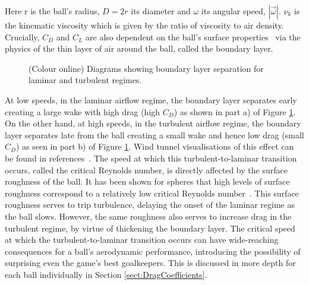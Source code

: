 \documentclass[a4paper]{article}
\begin{document}
Here r is the ball's radius, $D = 2r$ its diameter and $\omega$ its angular speed, $|\vec{\omega}|$.  $\nu_{k}$ is the kinematic viscosity which is given by the ratio of viscosity to air density.  Crucially, $C_D$ and $C_L$ are also dependent on the ball's surface properties~\cite{MehtaRD, AchenbachEhighRe,AchenbachEroughsurf, MehtaRDandPallisJM} via the physics of the thin layer of air around the ball, called the boundary layer.  
%
%
\begin{figure}[t!!] 
  \begin{center} 
  \captionsetup[subfigure]{width=0.42\textwidth}
 \end{center}
\vspace{-0.5cm}
 \caption{(Colour online) Diagrams showing boundary layer separation for laminar and turbulent regimes. }
 \label{fig:BoundaryLayerComparison}
\end{figure}
%
%
At low speeds, in the laminar airflow regime, the boundary layer separates early creating a large wake with high drag (high $C_D$) as shown in part a) of Figure \ref{fig:BoundaryLayerComparison}.  On the other hand, at high speeds, in the turbulent airflow regime, the boundary layer separates late from the ball creating a small wake and hence low drag (small $C_D$) as seen in part b) of Figure \ref{fig:BoundaryLayerComparison}. 
Wind tunnel visualisations of this effect can be found in references~\cite{AsaiTSeoKKobayashiOandSakashitaR, ThorstenKetal}.  The speed at which this turbulent-to-laminar transition occurs, called the critical Reynolds number, is directly affected by the surface roughness of the ball.  It has been shown for spheres that high levels of surface roughness correspond to a relatively low critical Reynolds number~\cite{AchenbachEroughsurf}.  This surface roughness serves to trip turbulence, delaying the onset of the laminar regime as the ball slows.  However, the same roughness also serves to increase drag in the turbulent regime, by virtue of thickening the boundary layer.  The critical speed at which the turbulent-to-laminar transition occurs can have wide-reaching consequences for a ball's aerodynamic performance, introducing the possibility of surprising even the game's best goalkeepers.  This is discussed in more depth for each ball individually in Section \ref{sect:DragCoefficients}.
\end{document}

